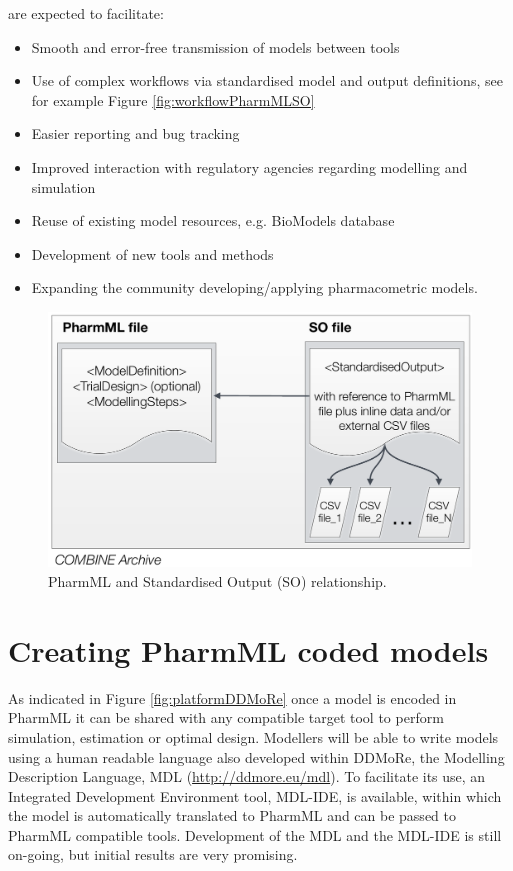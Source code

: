 are expected to facilitate:
\begin{itemize}
\item
Smooth and error-free transmission of models between tools
\item
Use of complex workflows via standardised model and output definitions, 
see for example Figure \ref{fig:workflowPharmMLSO}
\item
Easier reporting and bug tracking
\item
Improved interaction with regulatory agencies regarding modelling and simulation
\item
Reuse of existing model resources, e.g. BioModels database
\item
Development of new tools and methods
\item
Expanding the community developing/applying pharmacometric models.
\end{itemize}

\begin{figure}[ht!]
\centering
  \includegraphics[width=0.6\linewidth]{pics/PharmML_SO}
 \caption{PharmML and Standardised Output (SO) relationship.}
 \label{fig:PharmML_SO}
\end{figure}


\section{Creating PharmML coded models} 
\label{intro:creatingPharmML}

As indicated in Figure \ref{fig:platformDDMoRe} once a model is encoded 
in PharmML it can be shared with any compatible target tool to perform simulation, 
estimation or optimal design. Modellers will be able to write models 
using a human readable language also developed within DDMoRe, the 
Modelling Description Language, MDL (\url{http://ddmore.eu/mdl}). To facilitate its use, 
an Integrated Development Environment tool, MDL-IDE, is available, within which 
the model is automatically translated to PharmML and can be passed to PharmML 
compatible tools. Development of the MDL and the MDL-IDE is still on-going, 
but initial results are very promising. 

